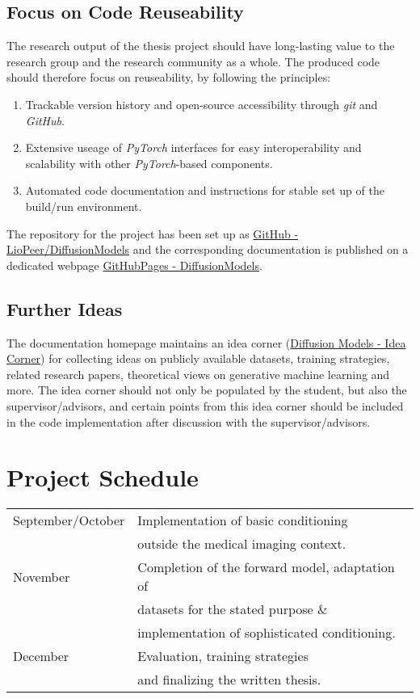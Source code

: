 \documentclass[a4paper]{article}
\begin{document}
\subsection{Focus on Code Reuseability}
The research output of the thesis project should have long-lasting value to the research group and the research community as a whole. The produced code should therefore focus on reuseability, by following the principles:
\begin{enumerate}
    \item Trackable version history and open-source accessibility through \textit{git} and \textit{GitHub}.
    \item Extensive useage of \textit{PyTorch} interfaces for easy interoperability and scalability with other \textit{PyTorch}-based components.
    \item Automated code documentation and instructions for stable set up of the build/run environment.
\end{enumerate}
The repository for the project has been set up as \href{https://github.com/liopeer/diffusionmodels}{GitHub - LioPeer/DiffusionModels} and the corresponding documentation is published on a dedicated webpage \href{https://liopeer.github.io/diffusionmodels/index.html}{GitHubPages - DiffusionModels}.

\subsection{Further Ideas}
\label{sec:ideacorner}
The documentation homepage maintains an idea corner (\href{https://liopeer.github.io/diffusionmodels/idea_corner.html}{Diffusion Models - Idea Corner}) for collecting ideas on publicly available datasets, training strategies, related research papers, theoretical views on generative machine learning and more. The idea corner should not only be populated by the student, but also the supervisor/advisors, and certain points from this idea corner should be included in the code implementation after discussion with the supervisor/advisors.

\section{Project Schedule}
\begin{tabular}{l l}
    September/October & Implementation of basic conditioning           \\ & outside the medical imaging context.                                                       \\
    November          & Completion of the forward model, adaptation of \\ & datasets for the stated purpose \& \\ & implementation of sophisticated conditioning. \\
    December          & Evaluation, training strategies                \\ & and finalizing the written thesis.
\end{tabular}
\end{document}
